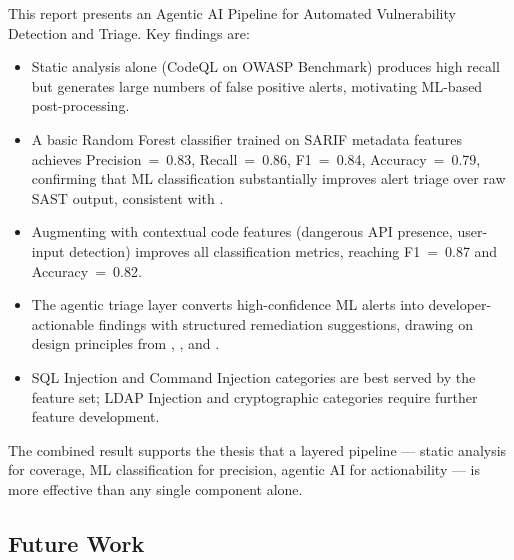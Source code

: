 \documentclass[conference]{IEEEtran}
\begin{document}
This report presents an Agentic AI Pipeline for Automated Vulnerability Detection
and Triage. Key findings are:

\begin{itemize}[leftmargin=*]
  \item Static analysis alone (CodeQL on OWASP Benchmark) produces high recall
        but generates large numbers of false positive alerts, motivating ML-based
        post-processing.
  \item A basic Random Forest classifier trained on SARIF metadata features
        achieves Precision~=~0.83, Recall~=~0.86, F1~=~0.84, Accuracy~=~0.79,
        confirming that ML classification substantially improves alert triage
        over raw SAST output, consistent with \cite{hegedus2022sca}.
  \item Augmenting with contextual code features (dangerous API presence,
        user-input detection) improves all classification metrics, reaching
        F1~=~0.87 and Accuracy~=~0.82.
  \item The agentic triage layer converts high-confidence ML alerts into
        developer-actionable findings with structured remediation suggestions,
        drawing on design principles from \cite{syed2025agentic},
        \cite{charoenwet2026agenticscr}, and \cite{bakane2025thesis}.
  \item SQL Injection and Command Injection categories are best served by the
        feature set; LDAP Injection and cryptographic categories require further
        feature development.
\end{itemize}

The combined result supports the thesis that a layered pipeline --- static
analysis for coverage, ML classification for precision, agentic AI for
actionability --- is more effective than any single component alone.

\subsection{Future Work}
\end{document}
